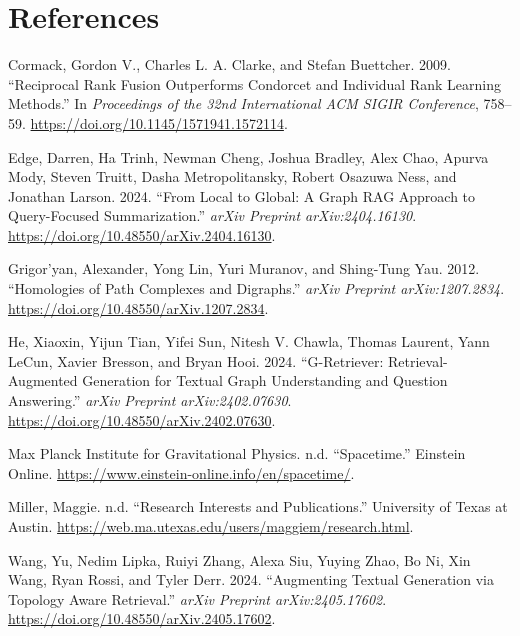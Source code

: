 \documentclass[
  english,
  11pt,
]{article}
\newlength{\cslhangindent}
\newenvironment{CSLReferences}[2] %
 {\begin{list}{}{%
  \setlength{\itemindent}{0pt}
  \setlength{\leftmargin}{0pt}
  \setlength{\parsep}{0pt}
  \ifodd #1
   \setlength{\leftmargin}{\cslhangindent}
   \setlength{\itemindent}{-1\cslhangindent}
  \fi
  \setlength{\itemsep}{#2\baselineskip}}}
 {\end{list}}
\begin{document}
\section*{References}\label{references}

\protect{}\label{refs}
\begin{CSLReferences}{1}{0}
Cormack, Gordon V., Charles L. A. Clarke, and Stefan Buettcher. 2009.
{``Reciprocal Rank Fusion Outperforms Condorcet and Individual Rank
Learning Methods.''} In \emph{Proceedings of the 32nd International ACM
SIGIR Conference}, 758--59.
\url{https://doi.org/10.1145/1571941.1572114}.

Edge, Darren, Ha Trinh, Newman Cheng, Joshua Bradley, Alex Chao, Apurva
Mody, Steven Truitt, Dasha Metropolitansky, Robert Osazuwa Ness, and
Jonathan Larson. 2024. {``From Local to Global: A Graph RAG Approach to
Query-Focused Summarization.''} \emph{arXiv Preprint arXiv:2404.16130}.
\url{https://doi.org/10.48550/arXiv.2404.16130}.

Grigor'yan, Alexander, Yong Lin, Yuri Muranov, and Shing-Tung Yau. 2012.
{``Homologies of Path Complexes and Digraphs.''} \emph{arXiv Preprint
arXiv:1207.2834}. \url{https://doi.org/10.48550/arXiv.1207.2834}.

He, Xiaoxin, Yijun Tian, Yifei Sun, Nitesh V. Chawla, Thomas Laurent,
Yann LeCun, Xavier Bresson, and Bryan Hooi. 2024. {``G-Retriever:
Retrieval-Augmented Generation for Textual Graph Understanding and
Question Answering.''} \emph{arXiv Preprint arXiv:2402.07630}.
\url{https://doi.org/10.48550/arXiv.2402.07630}.

Max Planck Institute for Gravitational Physics. n.d. {``Spacetime.''}
Einstein Online. \url{https://www.einstein-online.info/en/spacetime/}.

Miller, Maggie. n.d. {``Research Interests and Publications.''}
University of Texas at Austin.
\url{https://web.ma.utexas.edu/users/maggiem/research.html}.

Wang, Yu, Nedim Lipka, Ruiyi Zhang, Alexa Siu, Yuying Zhao, Bo Ni, Xin
Wang, Ryan Rossi, and Tyler Derr. 2024. {``Augmenting Textual Generation
via Topology Aware Retrieval.''} \emph{arXiv Preprint arXiv:2405.17602}.
\url{https://doi.org/10.48550/arXiv.2405.17602}.

\end{CSLReferences}
\end{document}
